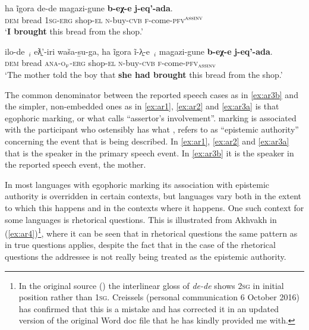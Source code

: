 \documentclass[output=paper]{langsci/langscibook}
\begin{document}
\begin{exe}
	\ex \label{ex:ar3}
	\begin{xlist}
		\ex \label{ex:ar3a}
		\gll ha	ĩgora de-de	magazi-gune	\textbf{b-eχ-e} \textbf{j-eq’-ada}.\\
		\textsc{dem} bread 1\textsc{sg}-\textsc{erg} shop-\textsc{el}	\textsc{n}-buy-\textsc{cvb} \textsc{f}-come-\textsc{pfv}$^{\textsc{assinv}}$\\
		\trans ‘\textbf{I brought} this bread from the shop.’
		
		\ex \label{ex:ar3b}
		\gll ilo-de $_i$ eƛ̱’-iri waša-s̱u-ga, ha	ĩgora ĩ-λ̱-e $_i$ magazi-gune	\textbf{b-eχ-e} \textbf{j-eq’-ada}.\\
		\textsc{dem} bread \textsc{ana}-\textsc{o}$_{\textsc{f}}$-\textsc{erg} shop-\textsc{el} \textsc{n}-buy-\textsc{cvb}	\textsc{f}-come-\textsc{pfv}$_{\textsc{assinv}}$\\
		\trans ‘The mother told the boy that \textbf{she had brought} this bread from the shop.’ \\ \cite[3]{Creissels2008}
	\end{xlist}	
\end{exe}


The common denominator between the reported speech cases as in \ref{ex:ar3b} and the simpler, non-embedded ones as in \ref{ex:ar1}, \ref{ex:ar2} and \ref{ex:ar3a} is that egophoric marking, or what \citeauthor{Creissels2008} calls “assertor’s involvement”.  marking is associated with the participant who ostensibly has what \cite{Hargreaves1991}, refers to as “epistemic authority” concerning the event that is being described.  In \ref{ex:ar1}, \ref{ex:ar2} and \ref{ex:ar3a} that is the speaker in the primary speech event. In \ref{ex:ar3b} it is the speaker in the reported speech event, the mother.

In most languages with egophoric marking its association with epistemic authority is overridden in certain contexts, but languages vary both in the extent to which this happens and in the contexts where it happens. One such context for some languages is rhetorical questions. This is illustrated from Akhvakh in (\ref{ex:ar4})\footnote{In the original source (\citealt[8]{Creissels2008}) the interlinear gloss of \textit{de-de} shows 2\textsc{sg} in initial position rather than 1\textsc{sg}. Creissels (personal communication 6 October 2016) has confirmed that this is a mistake and has corrected it in an updated version of the original Word doc file that he has kindly provided me with.}, where it can be seen that in rhetorical questions the same pattern as in true questions applies, despite the fact that in the case of the rhetorical questions the addressee is not really being treated as the epistemic authority.
\end{document}
